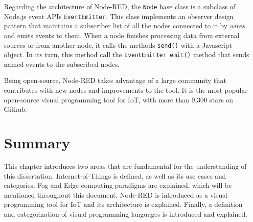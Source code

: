 \par Regarding the architecture of Node-RED, the \texttt{Node} base class is a subclass of Node.js event APIs \texttt{EventEmitter}. This class implements an observer design pattern that maintains a subscriber list of all the nodes connected to it by \emph{wires} and emits events to them. When a node finishes processing data from external sources or from another node, it calls the methods \texttt{send()} with a Javascript object. In its turn, this method call the \texttt{EventEmitter emit()} method that sends named events to the subscribed nodes. 
\par Being open-source, Node-RED takes advantage of a large community that contributes with new nodes and improvements to the tool. It is the most popular open-source visual programming tool for IoT, with more than 9,300 stars on Github.

\section{Summary}

This chapter introduces two areas that are fundamental for the understanding of this dissertation. Internet-of-Things is defined, as well as its use cases and categories. Fog and Edge computing paradigms are explained, which will be mentioned throughout this document. Node-RED is introduced as a visual programming tool for IoT and its architecture is explained. Finally, a definition and categorization of visual programming languages is introduced and explained.
